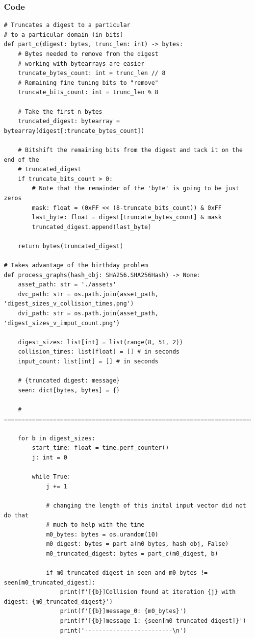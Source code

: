 \documentclass[11pt]{article}
\begin{document}
\subsubsection*{Code}
\begin{lstlisting}
# Truncates a digest to a particular
# to a particular domain (in bits)
def part_c(digest: bytes, trunc_len: int) -> bytes:
    # Bytes needed to remove from the digest 
    # working with bytearrays are easier
    truncate_bytes_count: int = trunc_len // 8
    # Remaining fine tuning bits to "remove"
    truncate_bits_count: int = trunc_len % 8

    # Take the first n bytes
    truncated_digest: bytearray = bytearray(digest[:truncate_bytes_count])

    # Bitshift the remaining bits from the digest and tack it on the end of the
    # truncated_digest
    if truncate_bits_count > 0:
        # Note that the remainder of the 'byte' is going to be just zeros
        mask: float = (0xFF << (8-truncate_bits_count)) & 0xFF
        last_byte: float = digest[truncate_bytes_count] & mask
        truncated_digest.append(last_byte)

    return bytes(truncated_digest)

# Takes advantage of the birthday problem 
def process_graphs(hash_obj: SHA256.SHA256Hash) -> None:
    asset_path: str = './assets' 
    dvc_path: str = os.path.join(asset_path, 'digest_sizes_v_collision_times.png')
    dvi_path: str = os.path.join(asset_path, 'digest_sizes_v_imput_count.png') 

    digest_sizes: list[int] = list(range(8, 51, 2))
    collision_times: list[float] = [] # in seconds
    input_count: list[int] = [] # in seconds

    # {truncated digest: message}
    seen: dict[bytes, bytes] = {}

    # =======================================================================

    for b in digest_sizes:
        start_time: float = time.perf_counter()
        j: int = 0

        while True:
            j += 1
           
            # changing the length of this inital input vector did not do that
            # much to help with the time
            m0_bytes: bytes = os.urandom(10)
            m0_digest: bytes = part_a(m0_bytes, hash_obj, False)
            m0_truncated_digest: bytes = part_c(m0_digest, b)
            
            if m0_truncated_digest in seen and m0_bytes != seen[m0_truncated_digest]:
                print(f'[{b}]Collision found at iteration {j} with digest: {m0_truncated_digest}')
                print(f'[{b}]message_0: {m0_bytes}')
                print(f'[{b}]message_1: {seen[m0_truncated_digest]}')
                print('-------------------------\n')


\end{lstlisting}
\end{document}
